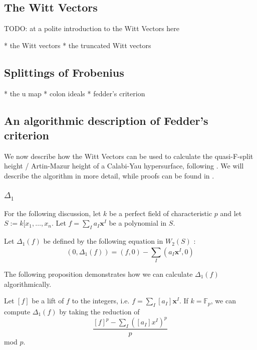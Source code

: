 
\subsection{The Witt Vectors}

TODO: at a polite introduction to the Witt Vectors here

* the Witt vectors
* the truncated Witt vectors

\subsection{Splittings of Frobenius}

* the u map
* colon ideals
* fedder's criterion

\subsection{An algorithmic description of Fedder's criterion}

We now describe how the Witt Vectors can be used to calculate the 
quasi-F-split height / Artin-Mazur height of a Calabi-Yau 
hypersurface, following \cite{quasifedder}.
We will describe the algorithm in more detail, while proofs can be
found in \cite{quasifedder}.

\subsubsection{\(\Delta_{1}\)}

For the following discussion, 
let \(k\) be a perfect field of characteristic \(p\) and 
let \(S := k[x_{1}, \ldots, x_{n}\).
Let \(f = \sum_{I}^{} a_{I}\mathbf{x}^{I}\) be a polynomial in \(S\).

\begin{defn}
	Let \(\Delta_{1}(f)\)
	be defined by the following equation in \(W_{2}(S)\) :
	\[
		(0, \Delta_{1}(f)) = (f,0) - \sum_{I}^{} (a_{I}\mathbf{x}^{I}, 0) 
	\] 
\end{defn}

The following proposition demonstrates how we can calculate 
\(\Delta_{1}(f)\) algorithmically.

\begin{prop}
	\label{prop:delta1:formula}
	Let \([f]\) be a lift of \(f\) to the integers,
	i.e.
	\(f = \sum_{I}^{} [a_{I}] \mathbf{x}^{I}\).
	If \(k = \mathbb{F}_{p}\),
	we can compute \(\Delta_{1}(f)\) by 
	taking the reduction of
	\[
		\frac{[f]^{p} - \sum_{I}^{} ([a_{I}]x^{I})^{p} }{p}
	\] 
	mod \(p\).
\end{prop}

